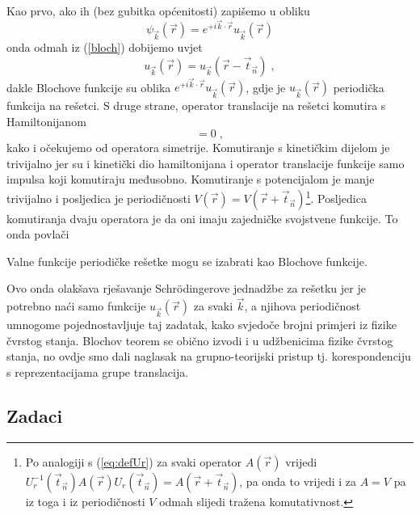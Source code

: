 Kao prvo, ako ih (bez gubitka općenitosti) zapišemo u obliku
\begin{equation}
 \psi_{\vec{k}}(\vec{r}) = e^{+i \vec{k}\cdot \vec{r}} u_{\vec{k}}(\vec{r})
\end{equation}
onda odmah iz (\ref{bloch}) dobijemo uvjet 
\begin{equation}
  u_{\vec{k}}(\vec{r}) = u_{\vec{k}}(\vec{r} - \vec{t}_{\vec{n}})  \;,
\end{equation}
dakle Blochove funkcije su oblika 
$e^{+i \vec{k}\cdot \vec{r}} u_{\vec{k}}(\vec{r})$,
gdje je $u_{\vec{k}}(\vec{r})$ periodička funkcija na rešetci.
S druge strane, operator translacije na rešetci komutira s Hamiltonijanom
\begin{equation}
    [H, U_{r}^{(\vec{k})} (\vec{t}_{\vec{n}}) ] = 0 \;,
\end{equation}
kako i očekujemo od operatora simetrije.
Komutiranje s kinetičkim dijelom je trivijalno jer su i kinetički dio
hamiltonijana i operator translacije funkcije samo impulsa koji
komutiraju međusobno.  Komutiranje s potencijalom je manje trivijalno
i posljedica je periodičnosti $V(\vec{r}) = 
V(\vec{r}+\vec{t}_{\vec{n}})$\footnote{Po analogiji s
    (\ref{eq:defUr}) za svaki operator $A(\vec{r})$ vrijedi
    $U_{r}^{-1}(\vec{t}_{\vec{n}})
A(\vec{r}) U_{r}(\vec{t}_{\vec{n}}) = A(\vec{r}+\vec{t}_{\vec{n}})$,
pa onda to vrijedi i za $A=V$ pa iz toga i iz periodičnosti $V$ odmah slijedi tražena
komutativnost.}.
Posljedica komutiranja dvaju operatora je da oni imaju zajedničke
svojstvene funkcije. To onda povlači
\begin{teorem}[Bloch]
Valne funkcije periodičke rešetke mogu se izabrati kao Blochove funkcije.
\end{teorem}

Ovo onda olakšava rješavanje Schr\"{o}dingerove jednadžbe
za rešetku jer je potrebno naći samo funkcije $u_{\vec{k}}(\vec{r})$ za
svaki $\vec{k}$,
a njihova periodičnost umnogome pojednostavljuje taj zadatak,
kako svjedoče brojni primjeri iz fizike čvrstog stanja.
Blochov teorem se obično izvodi i u udžbenicima fizike čvrstog
stanja, no ovdje smo dali naglasak
na grupno-teorijski pristup tj. korespondenciju s reprezentacijama
grupe translacija.

\subsection*{Zadaci}

